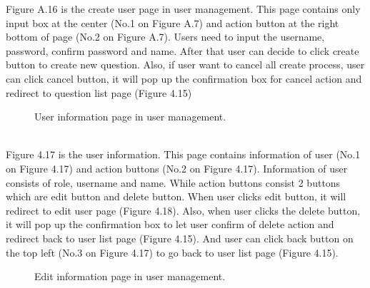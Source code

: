 \documentclass[12pt,oneside,openright,a4paper]{cpe-english-project}
\begin{document}
Figure A.16 is the create user page in user management. This page contains only 
input box at the center (No.1 on Figure A.7) and action button at the right bottom of page 
(No.2 on Figure A.7).
Users need to input the username, password, confirm password and name. After that 
user can decide to click create button to create new question. Also, if user want to cancel all 
create process, user can click cancel button, it will pop up the confirmation box for cancel 
action and redirect to question list page (Figure 4.15) \\
\begin{figure}[!h]\centering
{}
\caption{User information page in user management.
}\label{fig:User information page in user management.
}
\end{figure} \\

Figure 4.17 is the user information. This page contains information of user (No.1 on 
Figure 4.17) and action buttons (No.2 on Figure 4.17).
Information of user consists of role, username and name. While action buttons 
consist 2 buttons which are edit button and delete button. When user clicks edit button, it 
will redirect to edit user page (Figure 4.18). Also, when user clicks the delete button, it will 
pop up the confirmation box to let user confirm of delete action and redirect back to user list 
page (Figure 4.15). And user can click back button on the top left (No.3 on Figure 4.17) to 
go back to user list page (Figure 4.15). \\
\begin{figure}[!h]\centering
{}
\caption{Edit information page in user management.
}\label{fig:Edit information page in user management.
}
\end{figure} \\
\end{document}

